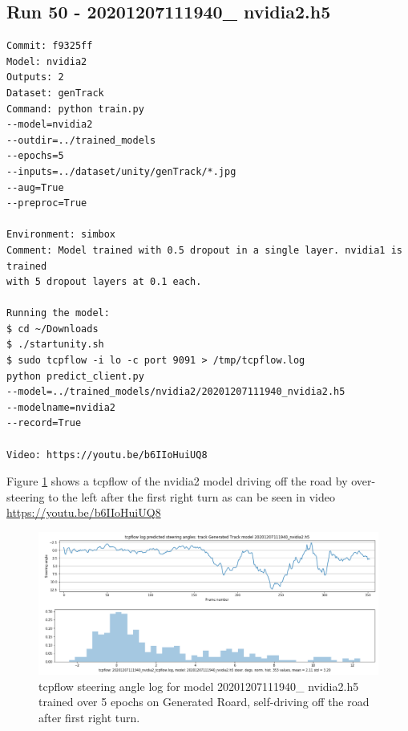 \subsection{Run 50 - 20201207111940\_ nvidia2.h5}
\label{app_res:50}
\begin{verbatim}
Commit: f9325ff
Model: nvidia2
Outputs: 2
Dataset: genTrack
Command: python train.py
--model=nvidia2
--outdir=../trained_models
--epochs=5
--inputs=../dataset/unity/genTrack/*.jpg
--aug=True
--preproc=True

Environment: simbox
Comment: Model trained with 0.5 dropout in a single layer. nvidia1 is trained
with 5 dropout layers at 0.1 each.

Running the model:
$ cd ~/Downloads
$ ./startunity.sh
$ sudo tcpflow -i lo -c port 9091 > /tmp/tcpflow.log
python predict_client.py
--model=../trained_models/nvidia2/20201207111940_nvidia2.h5
--modelname=nvidia2
--record=True

Video: https://youtu.be/b6IIoHuiUQ8

\end{verbatim}

Figure \ref{fig:20201207111940_nvidia2_tcpflow} shows a tcpflow of the nvidia2 model driving off the road by over-steering to the left after the first right turn as can be seen in video \url{https://youtu.be/b6IIoHuiUQ8} 

\begin{figure}[ht]
 \centering 
 \includegraphics[width=\textwidth]{Figures/20201207111940_nvidia2_tcpflow.png}
 \caption{tcpflow steering angle log for model 20201207111940\_ nvidia2.h5 trained over 5 epochs on Generated Roard, self-driving off the road after first right turn.}
 \label{fig:20201207111940_nvidia2_tcpflow}
\end{figure}

